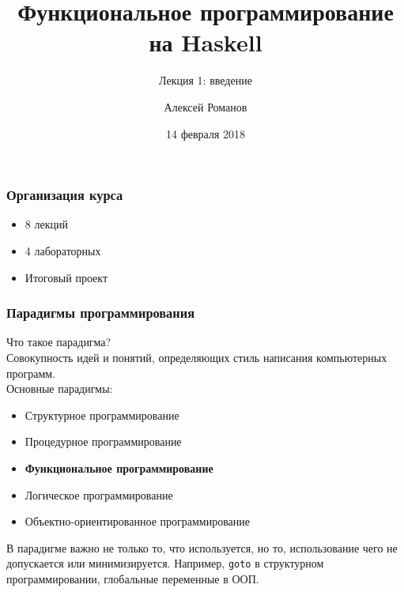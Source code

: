 \documentclass[11pt]{beamer}
\begin{document}
	\author{Алексей Романов}
	\title{Функциональное программирование на Haskell}
	\subtitle{Лекция 1: введение}
	\date{14 февраля 2018}
	\subject{Функциональное программирование на Haskell}
	\begin{frame}[plain]
	\maketitle
\end{frame}

\begin{frame}
\frametitle{Организация курса}
\begin{itemize}
    \item 8 лекций
    \item 4 лабораторных
    \item Итоговый проект
\end{itemize}
\end{frame}

\begin{frame}
\frametitle{Парадигмы программирования}
Что такое парадигма? \\
\pause
\hspace*{20pt} Совокупность идей и понятий, определяющих стиль написания компьютерных программ. \\
\pause
Основные парадигмы: \\
\pause
\begin{itemize}
    \item Структурное программирование
    \item Процедурное программирование
    \item \textbf{Функциональное программирование}
    \item Логическое программирование
    \item Объектно-ориентированное программирование
\end{itemize}
\pause
В парадигме важно не только то, что используется, но то, использование чего не допускается или минимизируется.
\pause
Например, \lstinline!goto! в структурном программировании, глобальные переменные в ООП.
\end{frame}
\end{document}
